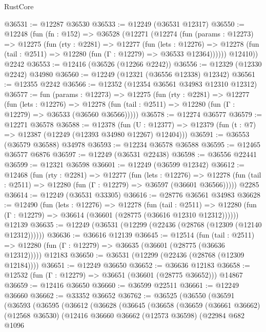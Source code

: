 \begin{lexlean}{RustCore}
\begin{coremodule}
@36531 := @12287 @36530
@36533 := @12249 (@36531 @12317)
@36550 := @12248
    (fun (fn : @152) =>
    @36528
      (@12271
        (@12274
          (fun (params : @12273) =>
          @12275
            (fun (rty : @2281) =>
            @12277
              (fun (lets : @12276) =>
              @12278 (fun (tail : @2511) => @12280 (fun (Γ : @12279) => @36533 @12364))))))
        @12410))
    @2242
@36553 := @12416 (@36526 (@12266 @2242))
@36556 := @12329 (@12330 @2242) @34980
@36560 := @12249 (@12321 (@36556 @12338) @12342)
@36561 := @12355 @2242
@36566 := @12352 (@12354 @36561 @34983 @12310 @12312)
@36577 := fun (params : @12273) =>
  @12275
    (fun (rty : @2281) =>
    @12277
      (fun (lets : @12276) =>
      @12278 (fun (tail : @2511) => @12280 (fun (Γ : @12279) => @36533 (@36560 @36566)))))
@36578 := @12274 @36577
@36579 := @12271 @36578
@36588 := @12378
    (fun (U : @12377) => @12379 (fun (t : @7) => @12387 (@12249 (@12393 @34980 @12267) @12404)))
@36591 := @36553 (@36579 @36588) @34978
@36593 := @12234 @36578 @36588
@36595 := @12465 @36577 @6876
@36597 := @12249 (@36531 @22438)
@36598 := @36556 @22441
@36599 := @12321 @36598
@36601 := @12249 (@36599 @12342)
@36612 := @12468
    (fun (rty : @2281) =>
    @12277
      (fun (lets : @12276) =>
      @12278 (fun (tail : @2511) => @12280 (fun (Γ : @12279) => @36597 (@36601 @36566)))))
    @2285
@36614 := @12249 (@36531 @33305)
@36616 := @28776 @36561 @34983
@36628 := @12490
    (fun (lets : @12276) =>
    @12278
      (fun (tail : @2511) =>
      @12280 (fun (Γ : @12279) => @36614 (@36601 (@28775 (@36616 @12310 @12312))))))
    @12139
@36635 := @12249 (@36531 (@12299 (@22436 (@28768 (@12309 (@12140 @12312))))))
@36636 := @36616 @12139
@36645 := @12514
    (fun (tail : @2511) => @12280 (fun (Γ : @12279) => @36635 (@36601 (@28775 (@36636 @12312)))))
    @12183
@36650 := @36531 (@12299 (@22436 (@28768 (@12309 @12184))))
@36651 := @12249 @36650
@36652 := @36636 @12183
@36658 := @12532 (fun (Γ : @12279) => @36651 (@36601 (@28775 @36652))) @14867
@36659 := @12416 @36650
@36660 := @36599 @22511
@36661 := @12249 @36660
@36662 := @33352 @36652
@36762 := @36525
    (@36550
      (@36591
        (@36593
          (@36595
            (@36612
              (@36628
                (@36645
                  (@36658
                    (@36659
                      (@36661 @36662)
                      (@12568 @36530)
                      (@12416
                        @36660
                        @36662
                        (@12573 @36598)
                        (@22984
                          @682
                          @1096

\end{coremodule}
\end{lexlean}
